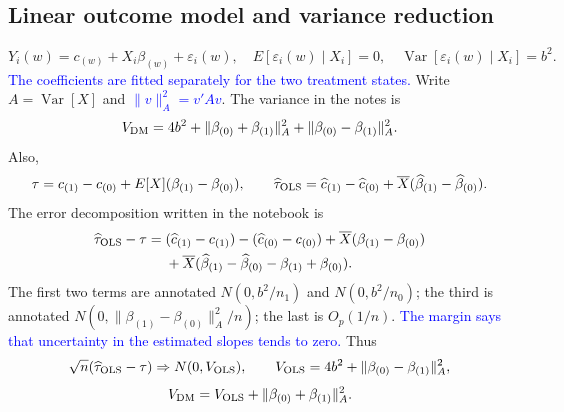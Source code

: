 \documentclass[11pt,a4paper]{article}
\newcommand{\inkblue}[1]{\textcolor{blue}{#1}}
\begin{document}
\subsection{Linear outcome model and variance reduction}
\[
Y_i(w)=c_{(w)}+X_i\beta_{(w)}+\varepsilon_i(w),\quad
E[\varepsilon_i(w)\mid X_i]=0,\quad
\operatorname{Var}[\varepsilon_i(w)\mid X_i]=b^2.
\]
\inkblue{The coefficients are fitted separately for the two treatment states.} Write $A=\operatorname{Var}[X]$ and \inkblue{$\|v\|_A^2=v'Av$}. The variance in the notes is
\[
V_{\rm DM}=4b^2+\|\beta_{(0)}+\beta_{(1)}\|_A^2
 +\|\beta_{(0)}-\beta_{(1)}\|_A^2.
\]
Also,
\[
\tau=c_{(1)}-c_{(0)}+E[X](\beta_{(1)}-\beta_{(0)}),\qquad
\widehat\tau_{\rm OLS}=\widehat c_{(1)}-\widehat c_{(0)}
 +\overline X(\widehat\beta_{(1)}-\widehat\beta_{(0)}).
\]
The error decomposition written in the notebook is
\begin{align*}
\widehat\tau_{\rm OLS}-\tau={}&(\widehat c_{(1)}-c_{(1)})-(\widehat c_{(0)}-c_{(0)})
 +\overline X(\beta_{(1)}-\beta_{(0)})\\
&+\overline X(\widehat\beta_{(1)}-\widehat\beta_{(0)}-\beta_{(1)}+\beta_{(0)}).
\end{align*}
The first two terms are annotated $N(0,b^2/n_1)$ and $N(0,b^2/n_0)$; the third is annotated $N(0,\|\beta_{(1)}-\beta_{(0)}\|_A^2/n)$; the last is $O_p(1/n)$. \inkblue{The margin says that uncertainty in the estimated slopes tends to zero.} Thus
\[
\sqrt n(\widehat\tau_{\rm OLS}-\tau)\Rightarrow N(0,V_{\rm OLS}),\qquad
V_{\rm OLS}=4b^2+\|\beta_{(0)}-\beta_{(1)}\|_A^2,
\]
\[
V_{\rm DM}=V_{\rm OLS}+\|\beta_{(0)}+\beta_{(1)}\|_A^2.
\]
\end{document}
